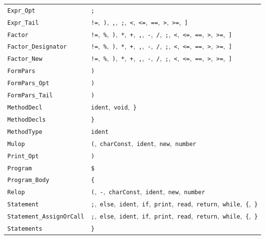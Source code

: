 \documentclass[11pt,a4paper]{article}
\begin{document}
\begin{center}
\begin{tabular}{|L{3.8cm}|L{10.6cm}|}
\texttt{Expr\_Opt} & \texttt{;} \\
\texttt{Expr\_Tail} & \texttt{!=},\ \texttt{)},\ \texttt{,},\ \texttt{;},\ \texttt{<},\ \texttt{<=},\ \texttt{==},\ \texttt{>},\ \texttt{>=},\ \texttt{]} \\
\texttt{Factor} & \texttt{!=},\ \texttt{\%},\ \texttt{)},\ \texttt{*},\ \texttt{+},\ \texttt{,},\ \texttt{-},\ \texttt{/},\ \texttt{;},\ \texttt{<},\ \texttt{<=},\ \texttt{==},\ \texttt{>},\ \texttt{>=},\ \texttt{]} \\
\texttt{Factor\_Designator} & \texttt{!=},\ \texttt{\%},\ \texttt{)},\ \texttt{*},\ \texttt{+},\ \texttt{,},\ \texttt{-},\ \texttt{/},\ \texttt{;},\ \texttt{<},\ \texttt{<=},\ \texttt{==},\ \texttt{>},\ \texttt{>=},\ \texttt{]} \\
\texttt{Factor\_New} & \texttt{!=},\ \texttt{\%},\ \texttt{)},\ \texttt{*},\ \texttt{+},\ \texttt{,},\ \texttt{-},\ \texttt{/},\ \texttt{;},\ \texttt{<},\ \texttt{<=},\ \texttt{==},\ \texttt{>},\ \texttt{>=},\ \texttt{]} \\
\texttt{FormPars} & \texttt{)} \\
\texttt{FormPars\_Opt} & \texttt{)} \\
\texttt{FormPars\_Tail} & \texttt{)} \\
\texttt{MethodDecl} & \texttt{ident},\ \texttt{void},\ \texttt{\}} \\
\texttt{MethodDecls} & \texttt{\}} \\
\texttt{MethodType} & \texttt{ident} \\
\texttt{Mulop} & \texttt{(},\ \texttt{charConst},\ \texttt{ident},\ \texttt{new},\ \texttt{number} \\
\texttt{Print\_Opt} & \texttt{)} \\
\texttt{Program} & \texttt{\$} \\
\texttt{Program\_Body} & \texttt{\{} \\
\texttt{Relop} & \texttt{(},\ \texttt{-},\ \texttt{charConst},\ \texttt{ident},\ \texttt{new},\ \texttt{number} \\
\texttt{Statement} & \texttt{;},\ \texttt{else},\ \texttt{ident},\ \texttt{if},\ \texttt{print},\ \texttt{read},\ \texttt{return},\ \texttt{while},\ \texttt{\{},\ \texttt{\}} \\
\texttt{Statement\_AssignOrCall} & \texttt{;},\ \texttt{else},\ \texttt{ident},\ \texttt{if},\ \texttt{print},\ \texttt{read},\ \texttt{return},\ \texttt{while},\ \texttt{\{},\ \texttt{\}} \\
\texttt{Statements} & \texttt{\}} \\

\end{tabular}
\end{center}
\end{document}
